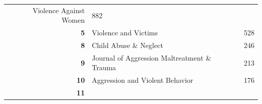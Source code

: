 \documentclass[]{tufte-handout}
\begin{document}
\begin{longtable}[]{@{}rlr@{}}
\begin{minipage}[t]{0.56\columnwidth}
Violence Against Women\strut
\end{minipage} & \begin{minipage}[t]{0.09\columnwidth}\raggedleft\strut
882\strut
\end{minipage}\tabularnewline
\begin{minipage}[t]{0.11\columnwidth}\raggedleft\strut
\textbf{5}\strut
\end{minipage} & \begin{minipage}[t]{0.56\columnwidth}\raggedright\strut
Violence and Victims\strut
\end{minipage} & \begin{minipage}[t]{0.09\columnwidth}\raggedleft\strut
528\strut
\end{minipage}\tabularnewline
\begin{minipage}[t]{0.11\columnwidth}\raggedleft\strut
\textbf{8}\strut
\end{minipage} & \begin{minipage}[t]{0.56\columnwidth}\raggedright\strut
Child Abuse \& Neglect\strut
\end{minipage} & \begin{minipage}[t]{0.09\columnwidth}\raggedleft\strut
246\strut
\end{minipage}\tabularnewline
\begin{minipage}[t]{0.11\columnwidth}\raggedleft\strut
\textbf{9}\strut
\end{minipage} & \begin{minipage}[t]{0.56\columnwidth}\raggedright\strut
Journal of Aggression Maltreatment \& Trauma\strut
\end{minipage} & \begin{minipage}[t]{0.09\columnwidth}\raggedleft\strut
213\strut
\end{minipage}\tabularnewline
\begin{minipage}[t]{0.11\columnwidth}\raggedleft\strut
\textbf{10}\strut
\end{minipage} & \begin{minipage}[t]{0.56\columnwidth}\raggedright\strut
Aggression and Violent Behavior\strut
\end{minipage} & \begin{minipage}[t]{0.09\columnwidth}\raggedleft\strut
176\strut
\end{minipage}\tabularnewline
\begin{minipage}[t]{0.11\columnwidth}\raggedleft\strut
\textbf{11}\strut
\end{minipage} & \begin{minipage}[t]{0.56\columnwidth}\raggedright\strut

\end{minipage}
\end{longtable}
\end{document}
